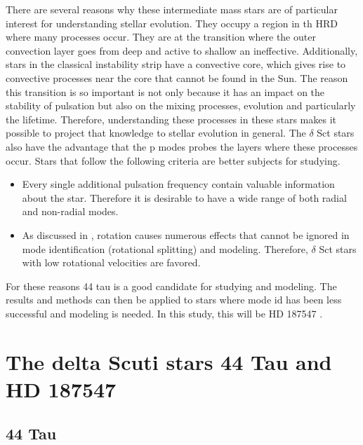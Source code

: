 There are several reasons why these intermediate mass stars are of particular interest for understanding stellar evolution. They occupy a region in th HRD where many processes occur. They are at the transition where the outer convection layer goes from deep and active to shallow an ineffective. Additionally, stars in the classical instability strip have a convective core, which gives rise to convective processes near the core that cannot be found in the Sun. The reason this transition is so important is not only because it has an impact on the stability of pulsation but also on the mixing processes, evolution and particularly the lifetime. Therefore, understanding these processes in these stars makes it possible to project that knowledge to stellar evolution in general. The $\delta$ Sct stars also have the advantage that the p modes probes the layers where these processes occur. Stars that follow the following criteria are better subjects for studying. 

\begin{itemize}
    \item Every single additional pulsation frequency contain valuable information about the star. Therefore it is desirable to have a wide range of both radial and non-radial modes. 
    \item As discussed in , rotation causes numerous effects that cannot be ignored in mode identification (rotational splitting) and modeling. Therefore,  $\delta$ Sct stars with low rotational velocities are favored. 
\end{itemize}

For these reasons 44 tau is a good candidate for studying and modeling. The results and methods can then be applied to stars where mode id has been less successful and modeling is needed. In this study, this will be HD 187547 \citep{antoci2014role}. 

\section{The delta Scuti stars 44 Tau and HD 187547}

\subsection{44 Tau}


